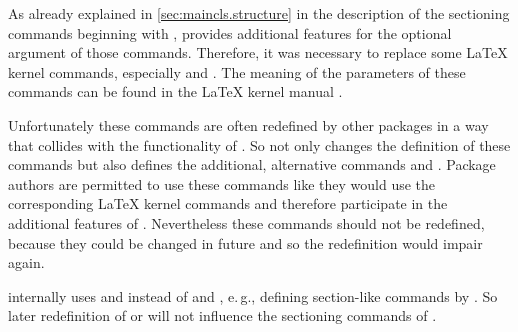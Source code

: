 \begin{Declaration}
                          \PValue{*}%
\end{Declaration}
As already explained in \autoref{sec:maincls.structure} in
the description of the sectioning commands beginning with
, \KOMAScript{} provides additional
features for the optional argument of those commands. Therefore, it was
necessary to replace some \LaTeX{} kernel commands, especially 
 and
%
. The meaning of the parameters of these
commands can be found in the \LaTeX{} kernel manual \cite{latex:source2e}.

Unfortunately these commands are often redefined by other packages in a way
that collides with the functionality of \KOMAScript. So \KOMAScript{} not only
changes the definition of these commands but also defines the additional,
alternative commands  and . Package
authors are permitted to use these commands like they would use the
corresponding \LaTeX{} kernel commands and therefore participate in the
additional features of \KOMAScript. Nevertheless these commands should not be
redefined, because they could be changed in future and so the redefinition would
impair \KOMAScript{} again.

\KOMAScript{} internally uses  and
 instead of  and ,
e.\,g., defining section-like commands by . So
later redefinition of  or  will not
influence the sectioning commands of \KOMAScript.

